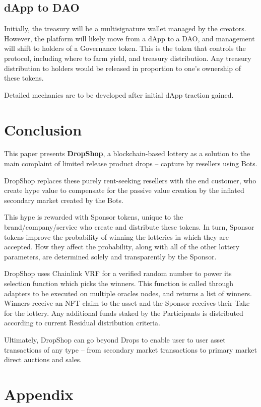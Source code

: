 \documentclass[runningheads]{llncs}
\begin{document}
\subsection{dApp to DAO}
Initially, the treasury will be a multisignature wallet managed by the creators.  However, the platform will likely move from a dApp to a DAO, and management will shift to holders of a Governance token.  This is the token that controls the protocol, including where to farm yield, and treasury distribution.  Any treasury distribution to holders would be released in proportion to one’s ownership of these tokens. 

Detailed mechanics are to be developed after initial dApp traction gained.


\section{Conclusion}
This paper presents \textbf{DropShop}, a blockchain-based lottery as a solution to the main complaint of limited release product drops – capture by resellers using Bots.

DropShop replaces these purely rent-seeking resellers with the end customer, who create hype value to compensate for the passive value creation by the inflated secondary market created by the Bots.

This hype is rewarded with Sponsor tokens, unique to the brand/company/service who create and distribute these tokens.  In turn, Sponsor tokens improve the probability of winning the lotteries in which they are accepted.  How they affect the probability, along with all of the other lottery parameters, are determined solely and transparently by the Sponsor.

DropShop uses Chainlink VRF for a verified random number to power its selection function which picks the winners.  This function is called through adapters to be executed on multiple oracles nodes, and returns a list of winners.  Winners receive an NFT claim to the asset and the Sponsor receives their Take for the lottery.  Any additional funds staked by the Participants is distributed according to current Residual distribution criteria.

Ultimately, DropShop can go beyond Drops to enable user to user asset transactions of any type – from secondary market transactions to primary market direct auctions and sales.


\section*{Appendix}
\appendix
\end{document}
